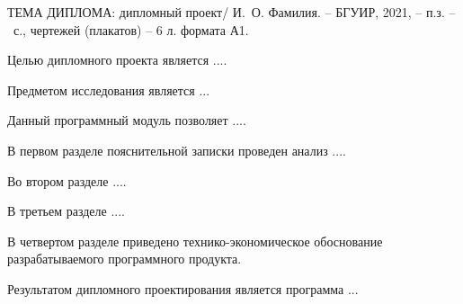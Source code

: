 \thispagestyle{empty}

ТЕМА ДИПЛОМА: дипломный проект/ И.~О. Фамилия. -- БГУИР, 2021, -- п.з. -- ~\pageref*{LastPage}с., чертежей (плакатов) -- 6 л. формата А1.

\vspace{4\parsep}


Целью дипломного проекта является .... 

Предметом исследования является ...

Данный программный модуль позволяет ....

В первом разделе пояснительной записки проведен анализ ....

Во втором разделе ....

В третьем разделе ....

В четвертом разделе приведено технико-экономическое обоснование разрабатываемого программного продукта.

Результатом дипломного проектирования является программа ...
\clearpage
